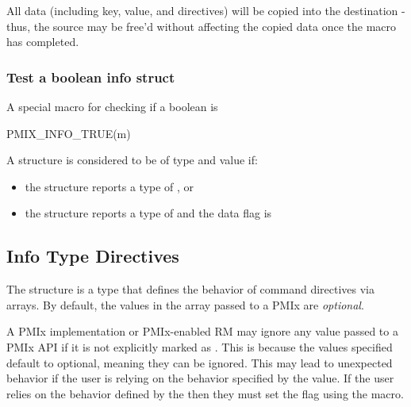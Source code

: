 \adviceuserstart
All data (including key, value, and directives) will be copied into the destination  - thus, the source  may be free'd without affecting the copied data once the macro has completed.
\adviceuserend


\subsubsection{Test a boolean info struct}

A special macro for checking if a boolean  is 

\cspecificstart
\begin{codepar}
PMIX_INFO_TRUE(m)
\end{codepar}
\cspecificend

\begin{arglist}
\end{arglist}

A  structure is considered to be of type  and value  if:

\begin{itemize}
    \item the structure reports a type of , or
    \item the structure reports a type of  and the data flag is 
\end{itemize}

\subsection{Info Type Directives}

The  structure is a  type that defines the behavior of command directives via  arrays.
By default, the values in the  array passed to a PMIx are \emph{optional}.

\adviceuserstart
A PMIx implementation or PMIx-enabled \ac{RM} may ignore any  value passed to a \ac{PMIx} \ac{API} if it is not explicitly marked as .
This is because the values specified default to optional, meaning they can be ignored.
This may lead to unexpected behavior if the user is relying on the behavior specified by the  value.
If the user relies on the behavior defined by the  then they must set the  flag using the  macro.
\adviceuserend

